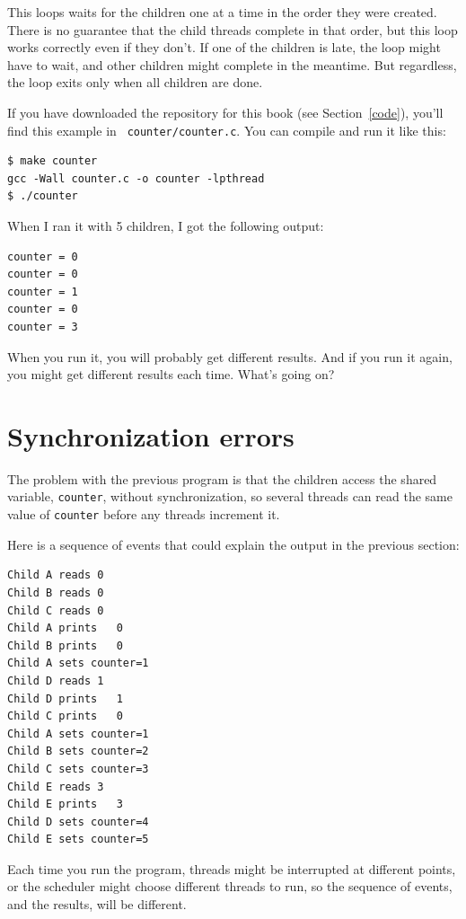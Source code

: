 \documentclass[12pt]{book}
\begin{document}
{This loops waits for the children one at a time in the order they
were created.  There is no guarantee that the child threads complete 
in that order, but this loop works correctly even if they don't.  If one
of the children is late, the loop might have to wait, and other children
might complete in the meantime.  But regardless, the loop exits
only when all children are done.

If you have downloaded the repository for this book (see
Section~\ref{code}), you'll find this example in {\tt
  counter/counter.c}.  You can compile and run it like this:

\begin{verbatim}
$ make counter
gcc -Wall counter.c -o counter -lpthread
$ ./counter
\end{verbatim}

When I ran it with 5 children, I got the following output:

\begin{verbatim}
counter = 0
counter = 0
counter = 1
counter = 0
counter = 3
\end{verbatim}

When you run it, you will probably get different results.  And if
you run it again, you might get different results each time.  What's
going on?


\section{Synchronization errors}

The problem with the previous program is that the children
access the shared variable, {\tt counter}, without synchronization,
so several threads can read the same value of {\tt counter} before
any threads increment it.

Here is a sequence of events that could explain the output in the
previous section:

\begin{verbatim}
Child A reads 0
Child B reads 0
Child C reads 0
Child A prints   0
Child B prints   0
Child A sets counter=1
Child D reads 1
Child D prints   1
Child C prints   0
Child A sets counter=1
Child B sets counter=2
Child C sets counter=3
Child E reads 3
Child E prints   3
Child D sets counter=4
Child E sets counter=5
\end{verbatim}

Each time you run the program, threads might be interrupted at different
points, or the scheduler might choose different threads to run, so
the sequence of events, and the results, will be different.

}
\end{document}
